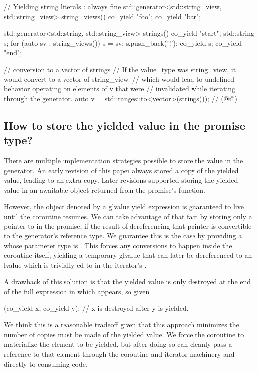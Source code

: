 \documentclass{wg21}
\begin{document}
\begin{colorblock}
// Yielding string literals : always fine
std::generator<std::string_view, std::string_view> string_views() {
    co_yield "foo";
    co_yield "bar";
}

std::generator<std::string, std::string_view> strings() {
    co_yield "start";
    std::string s;
    for (auto sv : string_views()) {
        s = sv;
        s.push_back('!');
        co_yield s;
    }
    co_yield "end";
}

// conversion to a vector of strings
// If the value_type was string_view, it would convert to a vector of string_view,
// which would lead to undefined behavior operating on elements of v that were
// invalidated while iterating through the generator.
auto v = std::ranges::to<vector>(strings()); // (@{}@)
\end{colorblock}


\subsection{How to store the yielded value in the promise type?}

There are multiple implementation strategies possible to store the value in the generator.
An early revision of this paper always stored a copy of the yielded value, leading to an extra copy.
Later revisions supported storing the yielded value in an awaitable object
returned from the promise's  function.

However, the object denoted by a glvalue yield expression is guaranteed
to live until the coroutine resumes.
We can take advantage of that fact by storing only a pointer to in the promise,
if the result of dereferencing that pointer is convertible to the generator's
reference type. We guarantee this is the case by providing a 
whose parameter type is
.
This forces any conversions to happen inside the coroutine itself,
yielding a temporary glvalue that can later be dereferenced
to an lvalue which is trivially ed to 
in the iterator's .

A drawback of this solution is that the yielded value is only destroyed at the end of the
full expression in which  appears, so given
\begin{colorblock}
    (co_yield x, co_yield y); // x is destroyed after y is yielded.
\end{colorblock}
We think this is a reasonable tradeoff given that this approach minimizes the
number of copies must be made of the yielded value.
We force the coroutine to materialize the element to be yielded,
but after doing so can cleanly pass a reference to that element through
the coroutine and iterator machinery and directly to consuming code.
\end{document}
